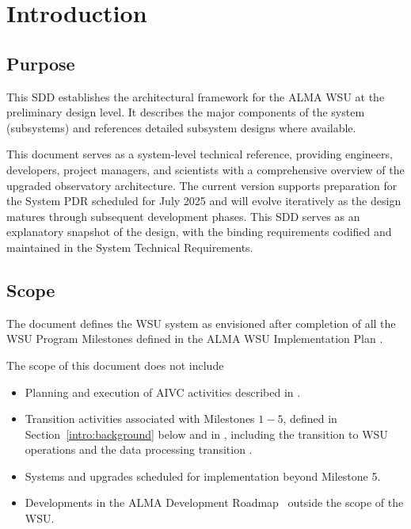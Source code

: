 \section{Introduction} 


\subsection{Purpose}


This \ac{SDD} establishes the architectural framework for the ALMA \ac{WSU} at the preliminary design level. It describes the major components of the system (subsystems) and references detailed subsystem designs where available.

This document serves as a system-level technical reference, providing engineers, developers, project managers, and scientists with a comprehensive overview of the upgraded observatory architecture. The current version supports preparation for the  System \ac{PDR} scheduled for July 2025 and will evolve iteratively as the design matures through subsequent development phases.
This SDD serves as an explanatory snapshot of the design, with the binding requirements codified and maintained in the System Technical Requirements.

 
\subsection{Scope}

The document defines the  WSU system as envisioned after completion of all the WSU Program Milestones defined in the ALMA WSU Implementation Plan \cite{imp_plan_b}.

The scope of this document does not include
\begin{itemize}[itemsep=-0.5em]
    \item Planning and execution of \ac{AIVC} activities described in \cite{aivc_report}.
    \item Transition activities associated with Milestones $1-5$, defined in Section~\ref{intro:background} below and in \cite{imp_plan_b}, including the transition to WSU operations \cite{TWO} and the data processing transition \cite{dp_tp}.
    \item Systems and upgrades scheduled for implementation beyond Milestone 5.
    \item Developments in the ALMA Development Roadmap~\cite{road_map} outside the scope of the WSU.
\end{itemize}

